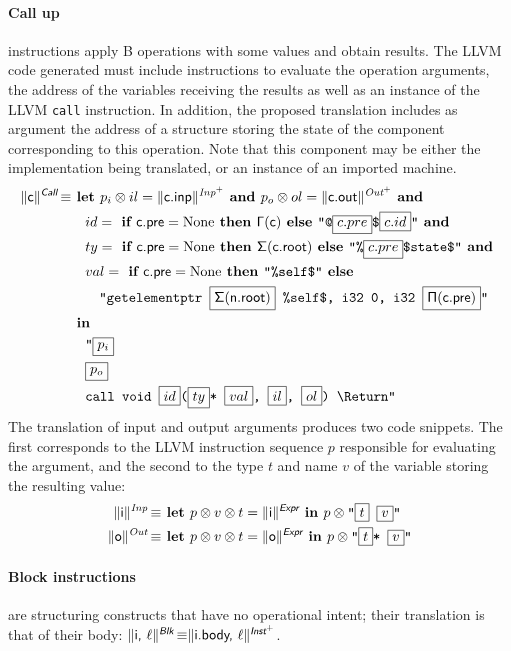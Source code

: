 \documentclass{llncs}
\newcommand{\trad}[2]{\ensuremath{\lVert \textsf{#1} \rVert^{\textit{#2}}}}
\newcommand{\nl}[0]{\text{\Return}}
\DeclareMathOperator{\isdef}{\equiv}
\newcommand{\llvm}[1]{\texttt{#1}}
\newcommand{\B}[1]{\textsf{#1}}
\newcommand{\ListOf}[1]{$\mbox{#1}^+$}
\newcommand{\IF}[0]{\textbf{ if }}
\newcommand{\ELSE}[0]{\textbf{ else }}
\newcommand{\THEN}[0]{\textbf{ then }}
\newcommand{\LET}[0]{\textbf{ let }}
\newcommand{\IN}[0]{\textbf{ in }}
\newcommand{\AND}[0]{\textbf{ and }}
\newcommand{\PH}[1]{\framebox{$#1$}}
\newcommand{\sep}[0]{\otimes}
\newcommand{\Global}[0]{\ensuremath{\sf\Gamma}}
\newcommand{\idx}[0]{\ensuremath{\sf\Pi}}
\newcommand{\state}[0]{\ensuremath{\sf\Sigma}}
\begin{document}
\paragraph{Call up} instructions apply B operations with some values and obtain
results. The LLVM code generated must include instructions to evaluate the
operation arguments, the address of the variables receiving the results as well
as an instance of the LLVM \llvm{call} instruction. In addition, the proposed
translation includes as argument the address of a structure storing the state of
the component corresponding to this operation. Note that this component may be
either the implementation being translated, or an instance of an imported
machine.
\begin{align*}
  \trad{c}{\B{Call}} \isdef 
  & \LET p_i \sep il = \trad{c.inp}{\ListOf{Inp}} \AND p_o \sep ol = 
  \trad{c.out}{\ListOf{Out}} \AND \\
  & \quad id = \IF \B{c.pre} = \text{None} \THEN \Global(\B{c}) \ELSE \llvm{"@\PH{c.pre}\$\PH{c.id}"} \AND \\
  & \quad ty = \IF \B{c.pre} = \text{None} \THEN \state(\B{c.root}) \ELSE \llvm{"\%\PH{c.pre}\$state\$"} \AND \\
  & \quad val = \IF \B{c.pre} = \text{None} \THEN \llvm{"\%self\$"} \ELSE \\
  & \quad \quad \llvm{"getelementptr \PH{\state(\B{n.root})} \%self\$, i32 0, i32 \PH{\idx(\B{c.pre})}"}\\
  & \IN \\
  & \quad \llvm{"\PH{p_i}} \\
  & \quad \llvm{\PH{p_o}} \\
  & \quad \llvm{call void \PH{id}(\PH{ty}* \PH{val}, \PH{il}, \PH{ol}) \nl"}
\end{align*}
The translation of input and output arguments produces two code snippets. The
first corresponds to the LLVM instruction sequence $p$ responsible for
evaluating the argument, and the second to the type $t$ and name $v$ of the
variable storing the resulting value:
\begin{align*}
  \trad{i}{Inp} \isdef 
  & \LET p \sep v \sep t = \trad{i}{\B{Expr}} \IN p \sep \llvm{"\PH{t} \PH{v}"}\\
  \trad{o}{Out} \isdef 
  & \LET p \sep v \sep t = \trad{o}{\B{Expr}} \IN p \sep \llvm{"\PH{t}* \PH{v}"}
\end{align*}

\paragraph{Block instructions} are structuring constructs that have no
operational intent; their translation is that of their body: $\trad{i,
  $\ell$}{\B{Blk}} \isdef \trad{i.body, $\ell$}{\ListOf{\B{Inst}}}$.
\end{document}
